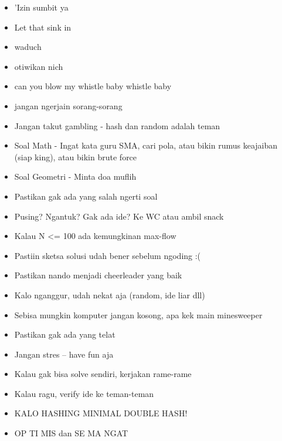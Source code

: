 \begin{itemize}
  \item 'Izin sumbit ya
  \item Let that sink in
  \item waduch
  \item otiwikan nich
  \item can you blow my whistle baby whistle baby
  \item jangan ngerjain sorang-sorang
  \item Jangan takut gambling - hash dan random adalah teman
  \item Soal Math - Ingat kata guru SMA, cari pola, atau bikin rumus keajaiban (siap king), atau bikin brute force
  \item Soal Geometri - Minta doa muflih
  \item Pastikan gak ada yang salah ngerti soal 
  \item Pusing? Ngantuk? Gak ada ide? Ke WC atau ambil snack
  \item Kalau N <= 100 ada kemungkinan max-flow
  \item Pastiin sketsa solusi udah bener sebelum ngoding :(
  \item Pastikan nando menjadi cheerleader yang baik
  \item Kalo nganggur, udah nekat aja (random, ide liar dll)
  \item Sebisa mungkin komputer jangan kosong, apa kek main minesweeper
  \item Pastikan gak ada yang telat
  \item Jangan stres -- have fun aja
  \item Kalau gak bisa solve sendiri, kerjakan rame-rame
  \item Kalau ragu, verify ide ke teman-teman
  \item KALO HASHING MINIMAL DOUBLE HASH!
  \item OP TI MIS dan SE MA NGAT
\end{itemize}
